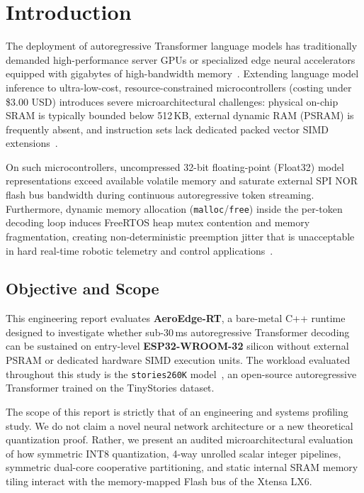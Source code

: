 \documentclass[10pt,a4paper]{article}
\begin{document}
\section{Introduction}
\label{sec:introduction}

The deployment of autoregressive Transformer language models has traditionally demanded high-performance server GPUs or specialized edge neural accelerators equipped with gigabytes of high-bandwidth memory~\cite{warden2019tinyml}. Extending language model inference to ultra-low-cost, resource-constrained microcontrollers (costing under \$3.00 USD) introduces severe microarchitectural challenges: physical on-chip SRAM is typically bounded below 512\,KB, external dynamic RAM (PSRAM) is frequently absent, and instruction sets lack dedicated packed vector SIMD extensions~\cite{espressif2024esp32datasheet,cadence2017xtensa}.

On such microcontrollers, uncompressed 32-bit floating-point (Float32) model representations exceed available volatile memory and saturate external SPI NOR flash bus bandwidth during continuous autoregressive token streaming. Furthermore, dynamic memory allocation (\texttt{malloc}/\texttt{free}) inside the per-token decoding loop induces FreeRTOS heap mutex contention and memory fragmentation, creating non-deterministic preemption jitter that is unacceptable in hard real-time robotic telemetry and control applications~\cite{barry2016freertos}.

\subsection{Objective and Scope}
This engineering report evaluates \textbf{AeroEdge-RT}, a bare-metal C++ runtime designed to investigate whether sub-30\,ms autoregressive Transformer decoding can be sustained on entry-level \textbf{ESP32-WROOM-32} silicon without external PSRAM or dedicated hardware SIMD execution units. The workload evaluated throughout this study is the \texttt{stories260K} model~\cite{karpathy2023llama2c,eldan2023tinystories}, an open-source autoregressive Transformer trained on the TinyStories dataset.

The scope of this report is strictly that of an engineering and systems profiling study. We do not claim a novel neural network architecture or a new theoretical quantization proof. Rather, we present an audited microarchitectural evaluation of how symmetric INT8 quantization, 4-way unrolled scalar integer pipelines, symmetric dual-core cooperative partitioning, and static internal SRAM memory tiling interact with the memory-mapped Flash bus of the Xtensa LX6.
\end{document}
